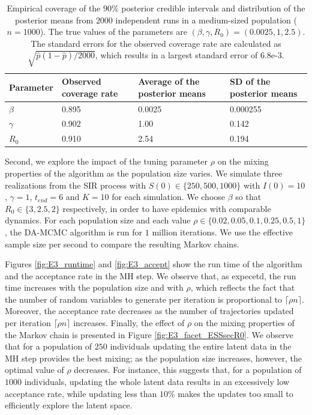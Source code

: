 \documentclass[11pt]{article}
\begin{document}
    \begin{table}
    \centering
    \begin{tabular}{ C{2cm}| *{3}{C{3cm}}}
        Parameter & Observed coverage rate & Average of the posterior means & SD of the posterior means \\ 
        \hline
        $\beta$ & 0.895 & 0.0025 & 0.000255 \\ 
        $\gamma$ & 0.902 & 1.00 & 0.142 \\ 
        $R_0$ & 0.910 & 2.54 & 0.194 \\
        \hline
    \end{tabular}
    \caption{Empirical coverage of the $90\%$ posterior credible intervals and distribution of the posterior means from $2000$ independent runs in a medium-sized population ($n=1000$). The true values of the parameters are $(\beta, \gamma, R_0) = (0.0025, 1, 2.5)$. The standard errors for the observed coverage rate are calculated as $\sqrt{\hat{p}(1-\hat{p})/2000}$, which results in a largest standard error of $6.8$e-3.}
    \label{tab:coverage}
    \end{table}
	
	Second, we explore the impact of the tuning parameter $\rho$ on the mixing properties of the algorithm as the population size varies.
	We simulate three realizations from the SIR process with $S(0) \in \{250, 500, 1000\}$ with  $I(0)=10$, $\gamma=1$, $t_{end} = 6$ and $K = 10$ for each simulation. We choose $\beta$ so that $R_0 \in \{3, 2.5, 2\}$ respectively, in order to have epidemics with comparable dynamics. For each population size and each value $\rho \in \{0.02, 0.05, 0.1, 0.25, 0.5, 1\}$, the DA-MCMC algorithm is run for $1$ million iterations. We use the effective sample size per second to compare the resulting Markov chains.
	
	Figures \ref{fig:E3_runtime} and \ref{fig:E3_accept} show the run time of the algorithm and the acceptance rate in the MH step. We observe that, as expecetd, the run time increases with the population size and with $\rho$, which reflects the fact that the number of random variables to generate per iteration is proportional to $\lceil\rho n\rceil$. Moreover, the acceptance rate decreases as the number of trajectories updated per iteration $\lceil\rho n\rceil$ increases.
	Finally, the effect of $\rho$ on the mixing properties of the Markov chain is presented in Figure \ref{fig:E3_facet_ESSsecR0}. We observe that for a population of $250$ individuals updating the entire latent data in the MH step provides the best mixing; as the population size increases, however, the optimal value of $\rho$ decreases. For instance, this suggests that, for a population of $1000$ individuals, updating the whole latent data results in an excessively low acceptance rate, while updating less than $10$\% makes the updates too small to efficiently explore the latent space.
	
\end{document}
